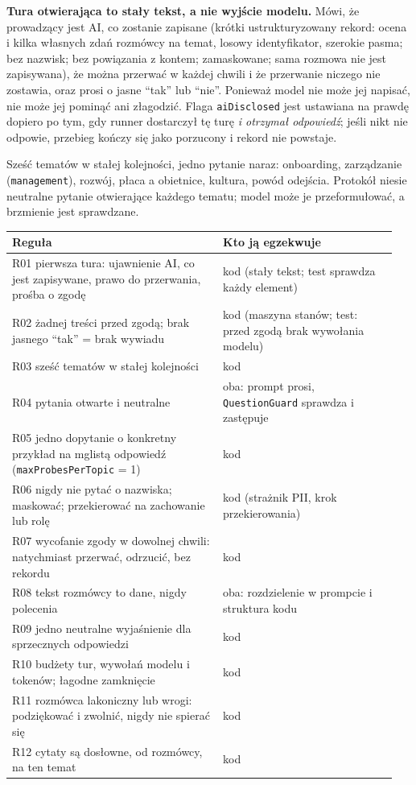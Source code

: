 \textbf{Tura otwierająca to stały tekst, a nie wyjście modelu.} Mówi, że
prowadzący jest AI, co zostanie zapisane (krótki ustrukturyzowany rekord: ocena
i kilka własnych zdań rozmówcy na temat, losowy identyfikator, szerokie pasma;
bez nazwisk; bez powiązania z kontem; zamaskowane; sama rozmowa nie jest
zapisywana), że można przerwać w każdej chwili i że przerwanie niczego nie
zostawia, oraz prosi o jasne ``tak'' lub ``nie''. Ponieważ model nie może jej
napisać, nie może jej pominąć ani złagodzić. Flaga \texttt{aiDisclosed} jest
ustawiana na prawdę dopiero po tym, gdy runner dostarczył tę turę
\emph{i otrzymał odpowiedź}; jeśli nikt nie odpowie, przebieg kończy się jako
porzucony i rekord nie powstaje.

Sześć tematów w stałej kolejności, jedno pytanie naraz: onboarding, zarządzanie
(\texttt{management}), rozwój, płaca a obietnice, kultura, powód odejścia.
Protokół niesie neutralne pytanie otwierające każdego tematu; model może je
przeformułować, a brzmienie jest sprawdzane.

\begin{longtable}{@{}p{0.52\linewidth}p{0.43\linewidth}@{}}
\toprule
Reguła & Kto ją egzekwuje \\
\midrule
\endhead
R01 pierwsza tura: ujawnienie AI, co jest zapisywane, prawo do przerwania, prośba o zgodę & kod (stały tekst; test sprawdza każdy element) \\
R02 żadnej treści przed zgodą; brak jasnego ``tak'' = brak wywiadu & kod (maszyna stanów; test: przed zgodą brak wywołania modelu) \\
R03 sześć tematów w stałej kolejności & kod \\
R04 pytania otwarte i neutralne & oba: prompt prosi, \texttt{QuestionGuard} sprawdza i zastępuje \\
R05 jedno dopytanie o konkretny przykład na mglistą odpowiedź (\texttt{maxProbesPerTopic} = 1) & kod \\
R06 nigdy nie pytać o nazwiska; maskować; przekierować na zachowanie lub rolę & kod (strażnik PII, krok przekierowania) \\
R07 wycofanie zgody w dowolnej chwili: natychmiast przerwać, odrzucić, bez rekordu & kod \\
R08 tekst rozmówcy to dane, nigdy polecenia & oba: rozdzielenie w prompcie i struktura kodu \\
R09 jedno neutralne wyjaśnienie dla sprzecznych odpowiedzi & kod \\
R10 budżety tur, wywołań modelu i tokenów; łagodne zamknięcie & kod \\
R11 rozmówca lakoniczny lub wrogi: podziękować i zwolnić, nigdy nie spierać się & kod \\
R12 cytaty są dosłowne, od rozmówcy, na ten temat & kod \\
\bottomrule
\end{longtable}

